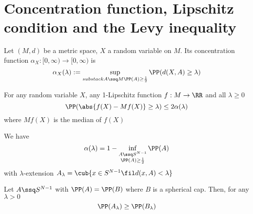 \section{Concentration function, Lipschitz condition and the Levy inequality}


\begin{defn}
    Let $(M,d)$ be a metric space, $X$ a random variable on $M$. Its concentration function $\alpha_X:[0,\infty) \to [0,\infty)$ is 
    $$\alpha_X(\lambda):= \sup_{substack{A\ssq M \\ \PP(A)\geq \frac{1}{2}}} \PP(d(X,A)\geq \lambda)$$
\end{defn}


\begin{thm}
    For any random variable $X$, any 1-Lipschitz function $f:M \to \RR$ and all $\lambda\geq 0$
    $$\PP(\abs{f(X)-Mf(X)}\geq \lambda) \leq 2 \alpha(\lambda)$$
    where $Mf(X)$ is the median of $f(X)$
\end{thm}


\begin{remark}
We have $$\alpha(\lambda)=1-\inf_{\substack{A\ssq S^{N-1} \\ \PP(A) \geq \frac{1}{2}}} \PP(A)$$
with $\lambda$-extension $A_\lambda= \cub{x\in S^{N-1} \fil d(x,A)<\lambda}$
\end{remark}

\begin{thm}
    Let $A\ssq S^{N-1}$ with $\PP(A)=\PP(B)$ where $B$ is a spherical cap. Then, for any $\lambda>0$
    $$\PP(A_\lambda)\geq \PP(B_\lambda)$$
\end{thm}

